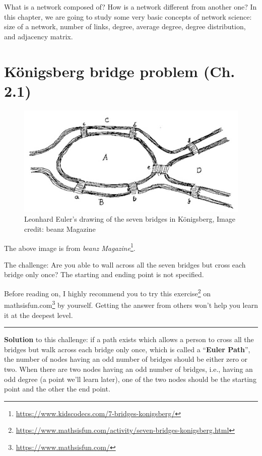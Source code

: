 \documentclass[
]{krantz}
\renewcommand{\href}[2]{#2\footnote{\url{#1}}}
\begin{document}
What is a network composed of? How is a network different from another one? In this chapter, we are going to study some very basic concepts of network science: size of a network, number of links, degree, average degree, degree distribution, and adjacency matrix.

\hypertarget{kuxf6nigsberg-bridge-problem-ch.-2.1}{%
\section{Königsberg bridge problem (Ch. 2.1)}\label{kuxf6nigsberg-bridge-problem-ch.-2.1}}

\begin{figure}

{\centering \includegraphics[width=0.7\linewidth]{./images/bridge} 

}

\caption{Leonhard Euler's drawing of the seven bridges in Königsberg, Image credit: beanz Magazine}\label{fig:unnamed-chunk-15}
\end{figure}

The above image is from \href{https://www.kidscodecs.com/7-bridges-konigsberg/}{\emph{beanz Magazine}}.

The challenge: Are you able to wall across all the seven bridges but cross each bridge only once? The starting and ending point is not specified.

Before reading on, I highly recommend you to try \href{https://www.mathsisfun.com/activity/seven-bridges-konigsberg.html}{this exercise} on \href{https://www.mathsisfun.com/}{mathsisfun.com} by yourself. Getting the answer from others won't help you learn it at the deepest level.

\begin{center}\rule{0.5\linewidth}{0.5pt}\end{center}

\textbf{Solution} to this challenge: if a path exists which allows a person to cross all the bridges but walk across each bridge only once, which is called a ``\textbf{Euler Path}'', the number of nodes having an odd number of bridges should be either zero or two. When there are two nodes having an odd number of bridges, i.e., having an odd degree (a point we'll learn later), one of the two nodes should be the starting point and the other the end point.
\end{document}
